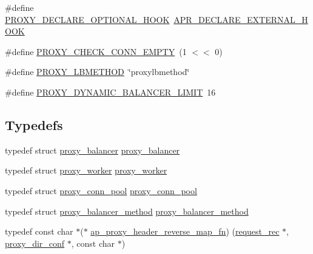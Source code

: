 \begin{DoxyCompactItemize}
\item 
\#define \hyperlink{group__MOD__PROXY_gada968588f8c63335878fd21f58ad4a4c}{P\+R\+O\+X\+Y\+\_\+\+D\+E\+C\+L\+A\+R\+E\+\_\+\+O\+P\+T\+I\+O\+N\+A\+L\+\_\+\+H\+O\+OK}~\hyperlink{group__MOD__SSL_ga1a722372d95d9b40ca6ed2fcd1c319f7}{A\+P\+R\+\_\+\+D\+E\+C\+L\+A\+R\+E\+\_\+\+E\+X\+T\+E\+R\+N\+A\+L\+\_\+\+H\+O\+OK}
\item 
\#define \hyperlink{group__MOD__PROXY_ga12aa80713615302da6f52d4fabd0f439}{P\+R\+O\+X\+Y\+\_\+\+C\+H\+E\+C\+K\+\_\+\+C\+O\+N\+N\+\_\+\+E\+M\+P\+TY}~(1 $<$$<$ 0)
\item 
\#define \hyperlink{group__MOD__PROXY_ga6be7b20b51864b2fe9e3c75ac75b049b}{P\+R\+O\+X\+Y\+\_\+\+L\+B\+M\+E\+T\+H\+OD}~\char`\"{}proxylbmethod\char`\"{}
\item 
\#define \hyperlink{group__MOD__PROXY_ga8e952312b614baa2ac9f5ceec0cdb708}{P\+R\+O\+X\+Y\+\_\+\+D\+Y\+N\+A\+M\+I\+C\+\_\+\+B\+A\+L\+A\+N\+C\+E\+R\+\_\+\+L\+I\+M\+IT}~16
\end{DoxyCompactItemize}
\subsection*{Typedefs}
\begin{DoxyCompactItemize}
\item 
typedef struct \hyperlink{structproxy__balancer}{proxy\+\_\+balancer} \hyperlink{group__MOD__PROXY_ga71f18e64e75843f565a2676dbee30b27}{proxy\+\_\+balancer}
\item 
typedef struct \hyperlink{structproxy__worker}{proxy\+\_\+worker} \hyperlink{group__MOD__PROXY_ga10d75bffd076f4f3e5da8f28c098c2b1}{proxy\+\_\+worker}
\item 
typedef struct \hyperlink{structproxy__conn__pool}{proxy\+\_\+conn\+\_\+pool} \hyperlink{group__MOD__PROXY_ga2a945e05af935856b17b4ef7079a3ad5}{proxy\+\_\+conn\+\_\+pool}
\item 
typedef struct \hyperlink{structproxy__balancer__method}{proxy\+\_\+balancer\+\_\+method} \hyperlink{group__MOD__PROXY_gae890583042aae45f2462322d529b7e4a}{proxy\+\_\+balancer\+\_\+method}
\item 
typedef const char $\ast$($\ast$ \hyperlink{group__MOD__PROXY_gacba8ab0ab8510a98dd6d1f8a1b2cc594}{ap\+\_\+proxy\+\_\+header\+\_\+reverse\+\_\+map\+\_\+fn}) (\hyperlink{structrequest__rec}{request\+\_\+rec} $\ast$, \hyperlink{structproxy__dir__conf}{proxy\+\_\+dir\+\_\+conf} $\ast$, const char $\ast$)
\end{DoxyCompactItemize}
